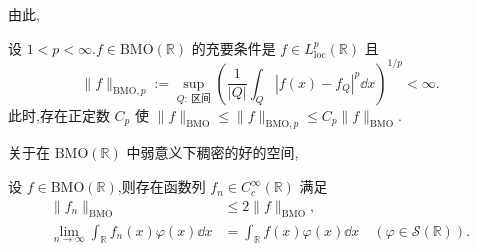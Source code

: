 由此,

\begin{lemma}\label{lem:1.13.9}
设 $1 < p < \infty$.$f \in \mathrm{BMO}(\mathbb{R})$ 的充要条件是 $f \in L_{\mathrm{loc}}^{p}(\mathbb{R})$ 且
\begin{equation*}
\| f \|_{\mathrm{BMO}, p} := \sup_{Q:\ \text{区间}}\left(\frac{1}{|Q|}\int_{Q}|f(x) - f_{Q}|^{p}\dd x\right)^{1/p} < \infty.
\end{equation*}
此时,存在正定数 $C_{p}$ 使 $\| f \|_{\mathrm{BMO}} \leq \| f \|_{\mathrm{BMO}, p} \leq C_{p}\| f \|_{\mathrm{BMO}}$.
\end{lemma}

关于在 $\mathrm{BMO}(\mathbb{R})$ 中弱意义下稠密的好的空间,

\begin{lemma}\label{lem:1.13.10}
设 $f \in \mathrm{BMO}(\mathbb{R})$,则存在函数列 $f_{n} \in C_{c}^{\infty}(\mathbb{R})$ 满足
\begin{equation*}
\begin{aligned}
\| f_{n} \|_{\mathrm{BMO}} &\leq 2\| f \|_{\mathrm{BMO}}, \\
\lim_{n \to \infty}\displaystyle\int_{\mathbb{R}}f_{n}(x)\varphi(x)\dd x &= \int_{\mathbb{R}}f(x)\varphi(x)\dd x \quad (\varphi \in \mathcal{S}(\mathbb{R})).
\end{aligned}
\end{equation*}
\end{lemma}
